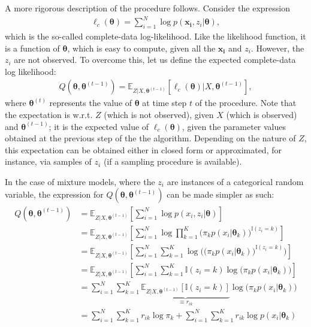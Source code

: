 A more rigorous description of the procedure follows. Consider the expression
\begin{align}
    \ell_c(\bm{\theta}) = \sum^N_{i=1} \log p(\bm{x_i}, z_i | \bm{\theta}),
\end{align} which is the so-called complete-data log-likelihood. Like the likelihood
function, it is a function of $\bm{\theta}$, which is easy to compute, given all
the $\bm{x_i}$ and $z_i$.
However, the $z_i$ are not observed. To overcome this, let us define the expected
complete-data log likelihood:
\begin{align}
    Q(\bm{\theta}, \bm{\theta}^{(t-1)}) = \mathbb{E}_{Z|X, \bm{\theta}^{(t-1)}}[\ell_c(\bm{\theta}) | X, \bm{\theta}^{(t-1)}],
\end{align} where $\bm{\theta}^{(t)}$ represents the value of $\bm{\theta}$ at time step
$t$ of the procedure. Note that the expectation is w.r.t. $Z$ (which is not observed),
given $X$ (which is observed)
and $\bm{\theta}^{(t-1)}$; it is the expected value of $\ell_c(\bm{\theta})$, given
the parameter values obtained at the previous step of the the algorithm. Depending
on the nature of $Z$, this expectation can be obtained either in closed form or
approximated, for instance, via samples of $z_i$ (if a sampling procedure is available).

In the case of mixture models, where the $z_i$ are instances of a categorical
random variable, the expression for $Q(\bm{\theta}, \bm{\theta}^{(t-1)})$ can be made
simpler as such:
\begin{align}
    Q(\bm{\theta}, \bm{\theta}^{(t-1)}) &= \mathbb{E}_{Z|X, \bm{\theta}^{(t-1)}}[\sum_{i=1}^N \log p(x_i, z_i | \bm{\theta})] \\
    &= \mathbb{E}_{Z|X, \bm{\theta}^{(t-1)}}[\sum_{i=1}^N \log \prod_{k=1}^K \big(\pi_k p(x_i | \bm{\theta}_k)\big)^{\mathbb{I}(z_i = k)}] \\
    &= \mathbb{E}_{Z|X, \bm{\theta}^{(t-1)}}[\sum_{i=1}^N \sum_{k=1}^K \log\Big(\big(\pi_k p(x_i | \bm{\theta}_k)\big)^{\mathbb{I}(z_i = k)}\Big)] \\
    &= \mathbb{E}_{Z|X, \bm{\theta}^{(t-1)}}[\sum_{i=1}^N \sum_{k=1}^K \mathbb{I}(z_i = k) \log\Big(\pi_k p(x_i | \bm{\theta}_k)\Big)] \\
    &= \sum_{i=1}^N \sum_{k=1}^K \underbrace{\mathbb{E}_{Z|X, \bm{\theta}^{(t-1)}}[\mathbb{I}(z_i = k)]}_{\equiv r_{ik}} \log\Big(\pi_k p(x_i | \bm{\theta}_k)\Big)\\
    &= \sum_{i=1}^N \sum_{k=1}^K r_{ik} \log\pi_k + \sum_{i=1}^N \sum_{k=1}^K r_{ik} \log p(x_i | \bm{\theta}_k) \label{eq:qthetatheta}
\end{align}

